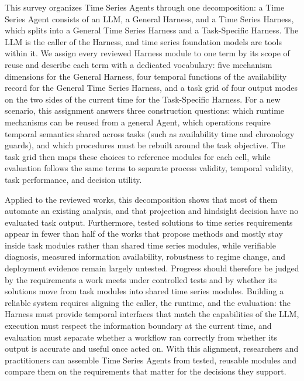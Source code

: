 \documentclass[preprints,article,submit,moreauthors]{Definitions/mdpi}
\begin{document}
This survey organizes Time Series Agents through one decomposition: a Time Series Agent consists of an LLM, a General Harness, and a Time Series Harness, which splits into a General Time Series Harness and a Task-Specific Harness. The LLM is the caller of the Harness, and time series foundation models are tools within it. We assign every reviewed Harness module to one term by its scope of reuse and describe each term with a dedicated vocabulary: five mechanism dimensions for the General Harness, four temporal functions of the availability record for the General Time Series Harness, and a task grid of four output modes on the two sides of the current time for the Task-Specific Harness. For a new scenario, this assignment answers three construction questions: which runtime mechanisms can be reused from a general Agent, which operations require temporal semantics shared across tasks (such as availability time and chronology guards), and which procedures must be rebuilt around the task objective. The task grid then maps these choices to reference modules for each cell, while evaluation follows the same terms to separate process validity, temporal validity, task performance, and decision utility.

Applied to the reviewed works, this decomposition shows that most of them automate an existing analysis, and that projection and hindsight decision have no evaluated task output. Furthermore, tested solutions to time series requirements appear in fewer than half of the works that propose methods and mostly stay inside task modules rather than shared time series modules, while verifiable diagnosis, measured information availability, robustness to regime change, and deployment evidence remain largely untested. Progress should therefore be judged by the requirements a work meets under controlled tests and by whether its solutions move from task modules into shared time series modules. Building a reliable system requires aligning the caller, the runtime, and the evaluation: the Harness must provide temporal interfaces that match the capabilities of the LLM, execution must respect the information boundary at the current time, and evaluation must separate whether a workflow ran correctly from whether its output is accurate and useful once acted on. With this alignment, researchers and practitioners can assemble Time Series Agents from tested, reusable modules and compare them on the requirements that matter for the decisions they support.
\end{document}
